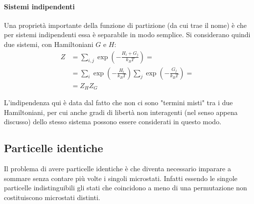 \paragraph{Sistemi indipendenti} Una proprietà importante della funzione di partizione (da cui trae il nome) è che per sistemi indipendenti essa è separabile in modo semplice. Si considerano quindi due sistemi, con Hamiltoniani $G$ e $H$:
\begin{align*}
Z &= \sum_{i,j} \exp \left( - \frac{H_i + G_j}{k_B T} \right) =\\
&= \sum_{i} \exp \left( - \frac{H_i}{k_B T} \right) \sum_{j} \exp \left( - \frac{G_j}{k_B T} \right) =\\
&= Z_H Z_G
\end{align*}

L'indipendenza qui è data dal fatto che non ci sono "termini misti" tra i due Hamiltoniani, per cui anche gradi di libertà non interagenti (nel senso appena discusso) dello stesso sistema possono essere considerati in questo modo.

\subsection{Particelle identiche}
\label{sec:idpart}

Il problema di avere particelle identiche è che diventa necessario imparare a sommare senza contare più volte i singoli microstati. Infatti essendo le singole particelle indistinguibili gli stati che coincidono a meno di una permutazione non costituiscono microstati distinti.


